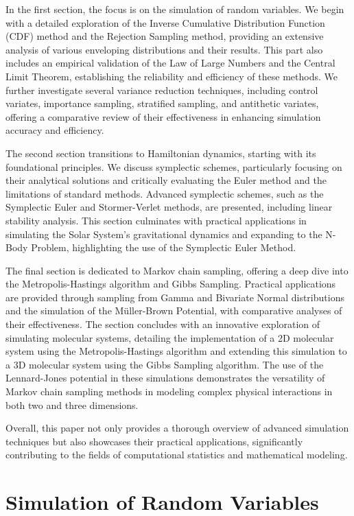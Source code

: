 \documentclass{report}
\begin{document}
In the first section, the focus is on the simulation of random variables. We begin with a detailed exploration of the Inverse Cumulative Distribution Function (CDF) method and the Rejection Sampling method, providing an extensive analysis of various enveloping distributions and their results. This part also includes an empirical validation of the Law of Large Numbers and the Central Limit Theorem, establishing the reliability and efficiency of these methods. We further investigate several variance reduction techniques, including control variates, importance sampling, stratified sampling, and antithetic variates, offering a comparative review of their effectiveness in enhancing simulation accuracy and efficiency.

The second section transitions to Hamiltonian dynamics, starting with its foundational principles. We discuss symplectic schemes, particularly focusing on their analytical solutions and critically evaluating the Euler method and the limitations of standard methods. Advanced symplectic schemes, such as the Symplectic Euler and Stormer-Verlet methods, are presented, including linear stability analysis. This section culminates with practical applications in simulating the Solar System's gravitational dynamics and expanding to the N-Body Problem, highlighting the use of the Symplectic Euler Method.

The final section is dedicated to Markov chain sampling, offering a deep dive into the Metropolis-Hastings algorithm and Gibbs Sampling. Practical applications are provided through sampling from Gamma and Bivariate Normal distributions and the simulation of the Müller-Brown Potential, with comparative analyses of their effectiveness. The section concludes with an innovative exploration of simulating molecular systems, detailing the implementation of a 2D molecular system using the Metropolis-Hastings algorithm and extending this simulation to a 3D molecular system using the Gibbs Sampling algorithm. The use of the Lennard-Jones potential in these simulations demonstrates the versatility of Markov chain sampling methods in modeling complex physical interactions in both two and three dimensions.

Overall, this paper not only provides a thorough overview of advanced simulation techniques but also showcases their practical applications, significantly contributing to the fields of computational statistics and mathematical modeling.

\newpage

\chapter{Simulation of Random Variables}
\label{sec:simulation_of_random_variables}
\end{document}
